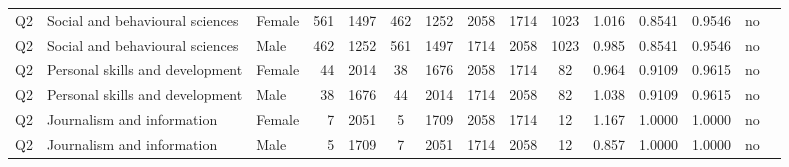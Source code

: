 \begin{longtable}{lllrcccccccccll}
Q2 & Social and behavioural sciences & Female & 561 & 1497 & 462 & 1252 & 2058 & 1714 & 1023 & 1.016 & 0.8541 & 0.9546 & no \\
Q2 & Social and behavioural sciences & Male & 462 & 1252 & 561 & 1497 & 1714 & 2058 & 1023 & 0.985 & 0.8541 & 0.9546 & no \\
Q2 & Personal skills and development & Female & 44 & 2014 & 38 & 1676 & 2058 & 1714 & 82 & 0.964 & 0.9109 & 0.9615 & no \\
Q2 & Personal skills and development & Male & 38 & 1676 & 44 & 2014 & 1714 & 2058 & 82 & 1.038 & 0.9109 & 0.9615 & no \\
Q2 & Journalism and information & Female & 7 & 2051 & 5 & 1709 & 2058 & 1714 & 12 & 1.167 & 1.0000 & 1.0000 & no \\
Q2 & Journalism and information & Male & 5 & 1709 & 7 & 2051 & 1714 & 2058 & 12 & 0.857 & 1.0000 & 1.0000 & no \\
\end{longtable}
